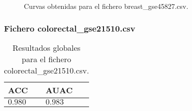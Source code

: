 \clearpage

\begin{figure}[htp]
    \centering
    \caption{Curvas obtenidas para el fichero breast\_gse45827.csv.}
    \label{fig:11}
\end{figure}

\bigbreak

\lipsum[1]

\clearpage


\subsubsection{Fichero colorectal\_gse21510.csv}

\begin{table}[htp]
    \small
    \centering
    \begin{tabularx}{\columnwidth}{Y Y}
        ACC       & AUAC    \\\hline
        $0.980$   & $0.983$ \\\hline
    \end{tabularx}
    \caption{Resultados globales para el fichero colorectal\_gse21510.csv.}
    \label{tab:14}
\end{table}

